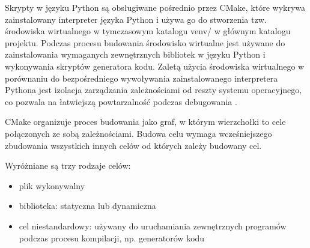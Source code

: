 Skrypty w języku Python są obsługiwane pośrednio przez CMake, które wykrywa zainstalowany interpreter języka Python i
używa go do stworzenia tzw. środowiska wirtualnego w tymczasowym katalogu venv/ w głównym katalogu projektu. Podczas
procesu budowania środowisko wirtualne jest używane do zainstalowania wymaganych zewnętrznych bibliotek w języku Python
i wykonywania skryptów generatora kodu. Zaletą użycia środowiska wirtualnego w porównaniu do bezpośredniego wywoływania
zainstalowanego interpretera Pythona jest izolacja zarządzania zależnościami od reszty systemu operacyjnego, co pozwala
na łatwiejszą powtarzalność podczas debugowania \cite{PEP405}.

CMake organizuje proces budowania jako graf, w którym wierzchołki to cele połączonych ze sobą zależnościami. Budowa celu
wymaga wcześniejszego zbudowania wszystkich innych celów od których zależy budowany cel.

Wyróżniane są trzy rodzaje celów:
\begin{itemize}
	\item {plik wykonywalny}
	\item {biblioteka}: statyczna lub dynamiczna
	\item {cel niestandardowy}: używany do uruchamiania zewnętrznych programów podczas procesu kompilacji, np. generatorów kodu
\end{itemize}

